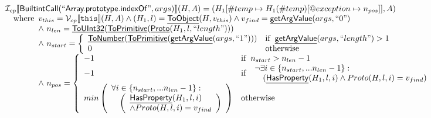 \documentclass{article}
\makeatletter
\newcommand{\SF}[1]{\mbox{\textsf{#1}}}
\newcommand{\TT}[1]{\mbox{\texttt{#1}}}
\newcommand{\wherec}[1]{{\rm where}\begin{array}[t]{l}#1\end{array}}
\newcommand{\ifc}[1]{{\rm if}\begin{array}[t]{l}#1\end{array}}
\newcommand{\owc}{{\rm otherwise}}
\newcommand{\I}{\mathcal{I}}
\newcommand{\V}{\mathcal{V}}
\newcommand{\lbr}{\llbracket}
\newcommand{\rbr}{\rrbracket}
\newcommand{\hf}[1]{\underline{\sf #1}}
\newcommand{\varloc}[1]{\##1}
\newcommand{\varprop}[1]{@#1}
\makeatother
\begin{document}
\[\begin{array}{l}
\I _{cp}\lbr \SF{BuiltintCall}(``\SF{Array.prototype.indexOf}",args)\rbr(H,A)
 = (H_1[\varloc{temp}\mapsto H_1(\varloc{temp})[\varprop{exception}\mapsto n_{pos}]], A) \\
\quad\wherec{
  v_{this} = \V _{cp}\lbr \TT{this}\rbr (H,A) \land (H_1,l) = \hf{ToObject}(H,v_{this})
  \land v_{find} = \hf{getArgValue}(args,``0")\\
  \land\ n_{len} = \hf{ToUInt32}(\hf{ToPrimitive}(\hf{Proto}(H_1, l, ``length")))\\
  \land\ n_{start} = \left\{\begin{array}{ll}
      \hf{ToNumber}(\hf{ToPrimitive}(\hf{getArgValue}(args, ``1")))
      & \ifc{\hf{getArgValue}(args, ``length") > 1}\\
      0 & \owc\\
    \end{array}\right.\\
  \land\ n_{pos} = \left\{\begin{array}{ll}
      -1 & \ifc{n_{start} > n_{len}-1}\\
      -1 & \ifc{\begin{array}{l}
        \neg\exists i \in \{n_{start},...n_{len}-1\}:\\
        \quad(\hf{HasProperty}(H_1,l,i) \land Proto(H,l,i) = v_{find})\end{array}}\\
      min\left(\begin{array}{l}
        \forall i \in \{n_{start},...n_{len}-1\}:\\
        \quad\left(\begin{array}{l}
          \hf{HasProperty}(H_1,l,i)\\
          \land Proto(H,l,i) = v_{find}\end{array}\right)\end{array}\right) & \owc
    \end{array}\right.\\
  }\\
\\\\

\end{array}
\]
\end{document}
